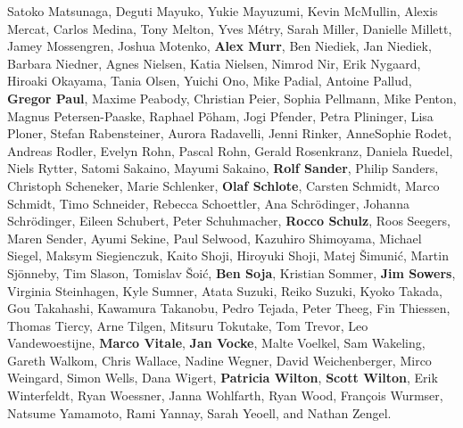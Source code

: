 Satoko Matsunaga,
Deguti Mayuko,
Yukie Mayuzumi,
Kevin McMullin,
Alexis Mercat,
Carlos Medina,
Tony Melton,
Yves Métry,
Sarah Miller,
Danielle Millett,
Jamey Mossengren,
Joshua Motenko,
\textbf{Alex Murr},
Ben Niediek,
Jan Niediek,
Barbara Niedner,
Agnes Nielsen,
Katia Nielsen,
Nimrod Nir,
Erik Nygaard,
Hiroaki Okayama,
Tania Olsen,
Yuichi Ono,
Mike Padial,
Antoine Pallud,
\textbf{Gregor Paul},
Maxime Peabody,
Christian Peier,
Sophia Pellmann,
Mike Penton,
Magnus Petersen-Paaske,
Raphael Pöham,
Jogi Pfender,
Petra Plininger,
Lisa Ploner,
Stefan Rabensteiner,
Aurora Radavelli,
Jenni Rinker,
AnneSophie Rodet,
Andreas Rodler,
Evelyn Rohn,
Pascal Rohn,
Gerald Rosenkranz,
Daniela Ruedel,
Niels Rytter,
Satomi Sakaino,
Mayumi Sakaino,
\textbf{Rolf Sander},
Philip Sanders,
Christoph Scheneker,
Marie Schlenker,
\textbf{Olaf Schlote},
Carsten Schmidt,
Marco Schmidt,
Timo Schneider,
Rebecca Schoettler,
Ana Schrödinger,
Johanna Schrödinger,
Eileen Schubert,
Peter Schuhmacher,
\textbf{Rocco Schulz},
Roos Seegers,
Maren Sender,
Ayumi Sekine,
Paul Selwood,
Kazuhiro Shimoyama,
Michael Siegel,
Maksym Siegienczuk,
Kaito Shoji,
Hiroyuki Shoji,
Matej Šimunić,
Martin Sjönneby,
Tim Slason,
Tomislav Šoić,
\textbf{Ben Soja},
Kristian Sommer,
\textbf{Jim Sowers},
Virginia Steinhagen,
Kyle Sumner,
Atata Suzuki,
Reiko Suzuki,
Kyoko Takada,
Gou Takahashi,
Kawamura Takanobu,
Pedro Tejada,
Peter Theeg,
Fin Thiessen,
Thomas Tiercy,
Arne Tilgen,
Mitsuru Tokutake,
Tom Trevor,
Leo Vandewoestijne,
\textbf{Marco Vitale},
\textbf{Jan Vocke},
Malte Voelkel,
Sam Wakeling,
Gareth Walkom,
Chris Wallace,
Nadine Wegner,
David Weichenberger,
Mirco Weingard,
Simon Wells,
Dana Wigert,
\textbf{Patricia Wilton},
\textbf{Scott Wilton},
Erik Winterfeldt,
Ryan Woessner,
Janna Wohlfarth,
Ryan Wood,
François Wurmser,
Natsume Yamamoto,
Rami Yannay,
Sarah Yeoell,
and
Nathan Zengel.
\endgroup
